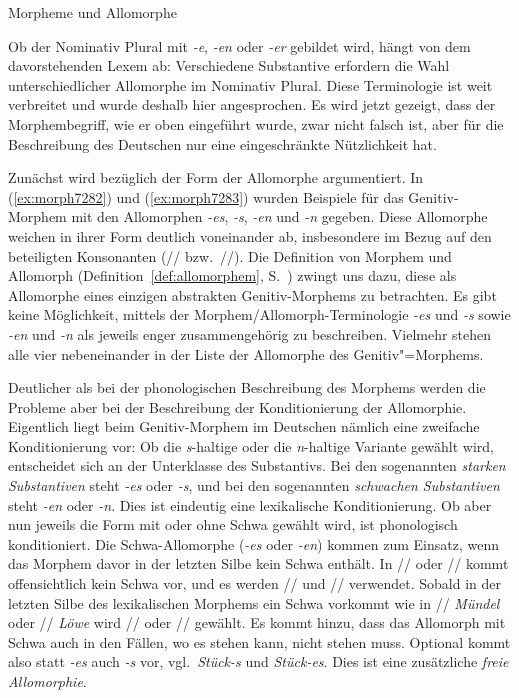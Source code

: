 \begin{Vertiefung}{Morpheme und Allomorphe}
\begin{exe}
  \ex \label{ex:morph9241}
  \begin{xlist}
  \end{xlist}
\end{exe}

Ob der Nominativ Plural mit \textit{-e}, \textit{-en} oder \textit{-er} gebildet wird, hängt von dem davorstehenden Lexem ab:
Verschiedene Substantive erfordern die Wahl unterschiedlicher Allomorphe im Nominativ Plural.
Diese Terminologie ist weit verbreitet und wurde deshalb hier angesprochen.
Es wird jetzt gezeigt, dass der Morphembegriff, wie er oben eingeführt wurde, zwar nicht falsch ist, aber für die Beschreibung des Deutschen nur eine eingeschränkte Nützlichkeit hat.

Zunächst wird bezüglich der Form der Allomorphe argumentiert.
In (\ref{ex:morph7282}) und (\ref{ex:morph7283}) wurden Beispiele für das Genitiv-Morphem mit den Allomorphen \textit{-es}, \textit{-s}, \textit{-en} und \textit{-n} gegeben.
Diese Allomorphe weichen in ihrer Form deutlich voneinander ab, insbesondere im Bezug auf den beteiligten Konsonanten (// bzw.\ //).
Die Definition von Morphem und Allomorph (Definition~\ref{def:allomorphem}, S.~\pageref{def:allomorphem}) zwingt uns dazu, diese als Allomorphe eines einzigen abstrakten Genitiv-Morphems zu betrachten.
Es gibt keine Möglichkeit, mittels der Morphem\slash Allomorph-Terminologie \textit{-es} und \textit{-s} sowie \textit{-en} und \textit{-n} als jeweils enger zusammengehörig zu beschreiben.
Vielmehr stehen alle vier nebeneinander in der Liste der Allomorphe des Genitiv"=Morphems.

Deutlicher als bei der phonologischen Beschreibung des Morphems werden die Probleme aber bei der Beschreibung der Konditionierung der Allomorphie.
Eigentlich liegt beim Genitiv-Morphem im Deutschen nämlich eine zweifache Konditionierung vor:
Ob die \textit{s}-haltige oder die \textit{n}-haltige Variante gewählt wird, entscheidet sich an der Unterklasse des Substantivs.
Bei den sogenannten \textit{starken Substantiven} steht \textit{-es} oder \textit{-s}, und bei den sogenannten \textit{schwachen Substantiven} steht \textit{-en} oder \textit{-n}.
Dies ist eindeutig eine lexikalische Konditionierung.
Ob aber nun jeweils die Form mit oder ohne Schwa gewählt wird, ist phonologisch konditioniert.
Die Schwa-Allomorphe (\textit{-es} oder \textit{-en}) kommen zum Einsatz, wenn das Morphem davor in der letzten Silbe kein Schwa enthält.
In // oder // kommt offensichtlich kein Schwa vor, und es werden // und // verwendet.
Sobald in der letzten Silbe des lexikalischen Morphems ein Schwa vorkommt wie in // \textit{Mündel} oder // \textit{Löwe} wird // oder // gewählt.
Es kommt hinzu, dass das Allomorph mit Schwa auch in den Fällen, wo es stehen kann, nicht stehen muss.
Optional kommt also statt \textit{-es} auch \textit{-s} vor, vgl.\ \textit{Stück-s} und \textit{Stück-es}.
Dies ist eine zusätzliche \textit{freie Allomorphie}.


\end{Vertiefung}
